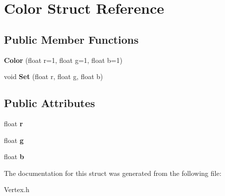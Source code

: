 \hypertarget{struct_color}{\section{Color Struct Reference}
\label{struct_color}
}
\subsection*{Public Member Functions}
\begin{DoxyCompactItemize}
\item 
\hypertarget{struct_color_aa2ccdb977158b64bf8ad9000f443b09c}{{\bfseries Color} (float r=1, float g=1, float b=1)}\label{struct_color_aa2ccdb977158b64bf8ad9000f443b09c}

\item 
\hypertarget{struct_color_acc77e4e3583d3eca7e476952e51bfb80}{void {\bfseries Set} (float r, float g, float b)}\label{struct_color_acc77e4e3583d3eca7e476952e51bfb80}

\end{DoxyCompactItemize}
\subsection*{Public Attributes}
\begin{DoxyCompactItemize}
\item 
\hypertarget{struct_color_a3958a556b47d2de3dd45c75aac833c20}{float {\bfseries r}}\label{struct_color_a3958a556b47d2de3dd45c75aac833c20}

\item 
\hypertarget{struct_color_a5defbb21620e480e556181772d665f34}{float {\bfseries g}}\label{struct_color_a5defbb21620e480e556181772d665f34}

\item 
\hypertarget{struct_color_a33e482be18d6ea31d2b403bee13683b7}{float {\bfseries b}}\label{struct_color_a33e482be18d6ea31d2b403bee13683b7}

\end{DoxyCompactItemize}


The documentation for this struct was generated from the following file\+:\begin{DoxyCompactItemize}
\item 
Vertex.\+h\end{DoxyCompactItemize}

